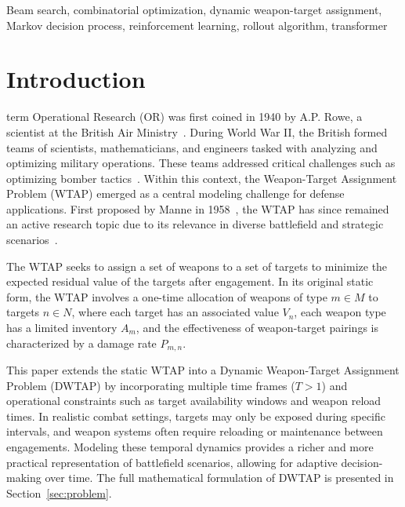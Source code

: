 \documentclass{ieeeaccess}
\begin{document}
\begin{keywords}
Beam search, combinatorial optimization, dynamic weapon-target assignment, Markov decision process, reinforcement learning, rollout algorithm, transformer
\end{keywords}

\titlepgskip=-21pt

\maketitle

\section{Introduction}
\label{sec:introduction}

 term Operational Research (OR) was first coined in 1940 by A.P. Rowe, a scientist at the British Air Ministry~\cite{britannica_operations_research}. During World War II, the British formed teams of scientists, mathematicians, and engineers tasked with analyzing and optimizing military operations. These teams addressed critical challenges such as optimizing bomber tactics~\cite{orhistory}. Within this context, the Weapon-Target Assignment Problem (WTAP) emerged as a central modeling challenge for defense applications. First proposed by Manne in 1958~\cite{manne1958target}, the WTAP has since remained an active research topic due to its relevance in diverse battlefield and strategic scenarios~\cite{ahuja2007exact}.

The WTAP seeks to assign a set of weapons to a set of targets to minimize the expected residual value of the targets after engagement. In its original static form, the WTAP involves a one-time allocation of weapons of type $m \in M$ to targets $n \in N$, where each target has an associated value $V_n$, each weapon type has a limited inventory $A_m$, and the effectiveness of weapon-target pairings is characterized by a damage rate $P_{m,n}$.

This paper extends the static WTAP into a Dynamic Weapon-Target Assignment Problem (DWTAP) by incorporating multiple time frames ($T > 1$) and operational constraints such as target availability windows and weapon reload times. In realistic combat settings, targets may only be exposed during specific intervals, and weapon systems often require reloading or maintenance between engagements. Modeling these temporal dynamics provides a richer and more practical representation of battlefield scenarios, allowing for adaptive decision-making over time. The full mathematical formulation of DWTAP is presented in Section~\ref{sec:problem}.
\end{document}
